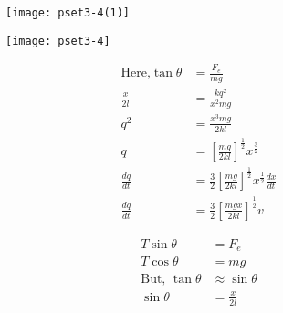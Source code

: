 \begin{enumerate}[label=\color{ocre}\textbf{\arabic*.}]
\begin{answer}
\begin{figure}[H]
\begin{minipage}{0.35\textwidth}
			\begin{center}
				\texttt{[image: pset3-4(1)]}
			\end{center}
	\end{minipage}\hspace{2cm}
		\begin{minipage}{0.35\textwidth}	
		\begin{center}
			\texttt{[image: pset3-4]}
		\end{center}
	\end{minipage}
\end{figure}
	\begin{minipage}{0.35\textwidth}
	\begin{align*}
	\text{Here,} \tan \theta&=\frac{F_{e}}{mg}\\
	\frac{x}{2l}&=\frac{kq^{2}}{x^{2}mg}\\
	q^{2}&=\frac{x^{3}mg}{2kl}     \\
	q&=\left[\frac{mg}{2kl} \right]^{\frac{1}{2}} x^{\frac{3}{2}}\\
	\frac{dq}{dt}&=\frac{3}{2}\left[\frac{mg}{2kl} \right]^{\frac{1}{2}}  x^{\frac{1}{2}} \frac{dx}{dt}\\
	\frac{dq}{dt}&=\frac{3}{2}\left[\frac{mgx}{2kl} \right]^{\frac{1}{2}} v
	\end{align*}

\end{minipage}\hspace{2cm}
\begin{minipage}{0.35\textwidth}	
	
	\begin{align*}
	T\sin\theta&=F_{e}\\
	T\cos\theta&=mg\\
	\text{But, }\tan \theta&\approx\sin\theta\\
	\sin\theta&=\frac{x}{2l}
	\end{align*}
\end{minipage}
		

	
	



\end{answer}
\end{enumerate}
